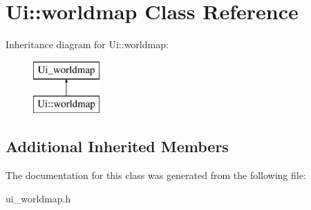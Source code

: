 \hypertarget{class_ui_1_1worldmap}{\section{Ui\-:\-:worldmap Class Reference}
\label{class_ui_1_1worldmap}
}
Inheritance diagram for Ui\-:\-:worldmap\-:\begin{figure}[H]
\begin{center}
\leavevmode
\includegraphics[height=2.000000cm]{class_ui_1_1worldmap}
\end{center}
\end{figure}
\subsection*{Additional Inherited Members}


The documentation for this class was generated from the following file\-:\begin{DoxyCompactItemize}
\item 
ui\-\_\-worldmap.\-h\end{DoxyCompactItemize}
